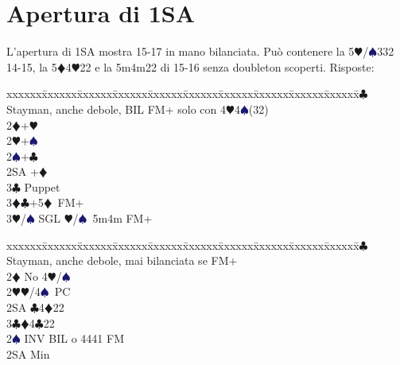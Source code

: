 \documentclass[a4paper,italian]{article}
\newcommand{\BC}{\textcolor{OliveGreen}{$\clubsuit$}}
\newcommand{\BD}{\textcolor{RedOrange}{$\vardiamondsuit$}}
\newcommand{\BH}{\textcolor{Red2}{$\varheartsuit${}}}
\newcommand{\BS}{\textcolor{MidnightBlue}{$\spadesuit${}}}
\newenvironment{bidtable}
{\begin{tabbing}

    xxxxxx\=xxxxxx\=xxxxxx\=xxxxxx\=xxxxxx\=xxxxxx\=xxxxxx\=xxxxxx\=xxxxxx\=xxxxxx\=\kill}
{\end{tabbing} }%
\begin{document}
                                    \section{Apertura di 1SA}
                                    \begin{multicols}{2}
                                        L'apertura di 1SA mostra 15-17 in mano bilanciata. Può contenere la 5\BH /\BS 332 14-15,
                                        la 5\BD 4\BH 22 e la 5m4m22 di 15-16 senza doubleton scoperti.
                                        Risposte:
                                        \bigbreak
                                        \begin{bidtable}
                                            2\BC \> Stayman, anche debole, BIL FM+ solo con 4\BH4\BS(32)\\
                                            2\BD {}+\BH \\
                                            2\BH {}+\BS \\
                                            2\BS {}+\BC \\
                                            2SA +\BD \\
                                            3\BC \> Puppet\\
                                            3\BD {}\BC +5\BD\ FM+\\
                                            3\BH/\BS \> SGL \BH/\BS\ 5m4m FM+
                                        \end{bidtable}
                                        \bigbreak
                                        \begin{bidtable}
                                            2\BC \> Stayman, anche debole, mai bilanciata se FM+\+\\
                                            2\BD \> No 4\BH /\BS \+\\
                                            2\BH {}\BH /4\BS\ PC\+\\
                                            2SA \BC 4\BD 22\\
                                            3\BC {}\BD 4\BC 22\-\\
                                            2\BS \> INV BIL o 4441 FM\+\\
                                            2SA \> Min\+\\

\end{bidtable}
\end{multicols}
\end{document}
